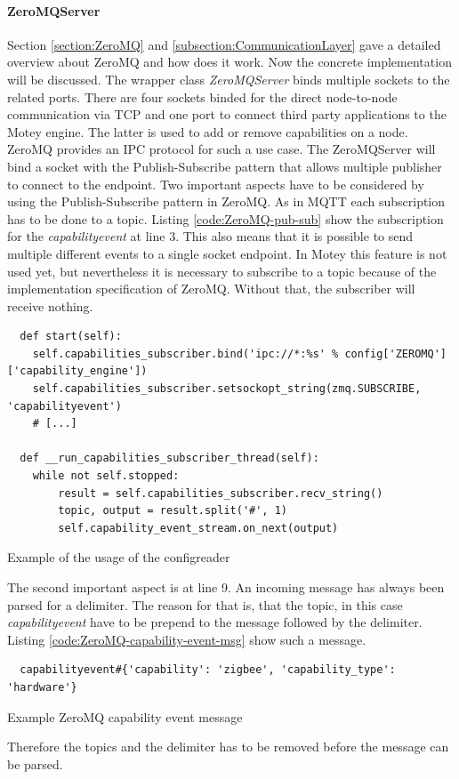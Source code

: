 \paragraph{ZeroMQServer}
Section \ref{section:ZeroMQ} and \ref{subsection:CommunicationLayer} gave a detailed overview about ZeroMQ and how does it work.
Now the concrete implementation will be discussed.
The wrapper class \textit{ZeroMQServer} binds multiple sockets to the related ports.
There are four sockets binded for the direct node-to-node communication via \ac{TCP} and one port to connect third party applications to the Motey engine.
The latter is used to add or remove capabilities on a node.
ZeroMQ provides an \ac{IPC} protocol for such a use case.
The ZeroMQServer will bind a socket with the Publish-Subscribe pattern that allows multiple publisher to connect to the endpoint.
Two important aspects have to be considered by using the Publish-Subscribe pattern in ZeroMQ.
As in \ac{MQTT} each subscription has to be done to a topic.
Listing \ref{code:ZeroMQ-pub-sub} show the subscription for the \textit{capabilityevent} at line 3.
This also means that it is possible to send multiple different events to a single socket endpoint.
In Motey this feature is not used yet, but nevertheless it is necessary to subscribe to a topic because of the implementation specification of ZeroMQ.
Without that, the subscriber will receive nothing.

\begin{listing}[H]
  \begin{verbatim}
  def start(self):
    self.capabilities_subscriber.bind('ipc://*:%s' % config['ZEROMQ']['capability_engine'])
    self.capabilities_subscriber.setsockopt_string(zmq.SUBSCRIBE, 'capabilityevent')
    # [...]

  def __run_capabilities_subscriber_thread(self):
    while not self.stopped:
        result = self.capabilities_subscriber.recv_string()
        topic, output = result.split('#', 1)
        self.capability_event_stream.on_next(output)
  \end{verbatim}
  \caption{Example of the usage of the configreader}
  \label{code:ZeroMQ-pub-sub}
\end{listing}

The second important aspect is at line 9.
An incoming message has always been parsed for a delimiter.
The reason for that is, that the topic, in this case \textit{capabilityevent} have to be prepend to the message followed by the delimiter.
Listing \ref{code:ZeroMQ-capability-event-msg} show such a message.
\begin{listing}[H]
  \begin{verbatim}
  capabilityevent#{'capability': 'zigbee', 'capability_type': 'hardware'}
  \end{verbatim}
  \caption{Example ZeroMQ capability event message}
  \label{code:ZeroMQ-capability-event-msg}
\end{listing}
Therefore the topics and the delimiter has to be removed before the message can be parsed.

